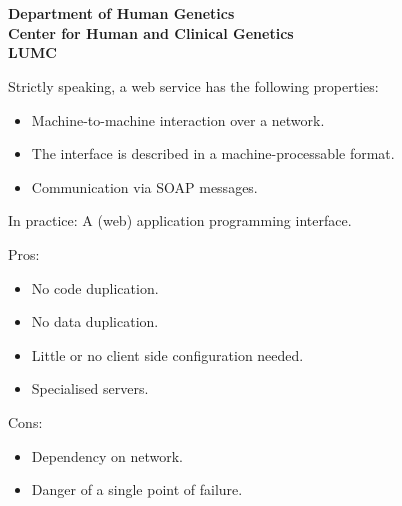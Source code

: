 \documentclass[a4, portrait]{seminar}
\begin{document}
\addtoslidelength{\slidewidth}{6cm}


\begin{slide}
\vspace*{1.5cm}
\begin{center}
{\bf\Large{\myTitle}}\\
\vfill
{\bf
  \small{\me}\\
  \small{Department of Human Genetics}\\
  \small{Center for Human and Clinical Genetics}\\
  \small{LUMC}
}
\vspace{1.1cm}
\end{center}
\end{slide}


\begin{slide}
Strictly speaking, a web service has the following properties:

\vspace*{1cm}
\begin{itemize}
\item Machine-to-machine interaction over a network.
\item The interface is described in a machine-processable format.
\item Communication via SOAP messages.
\end{itemize}

\vspace*{1cm}
In practice: A (web) application programming interface.
\vfill
\end{slide}

\begin{slide}
Pros:
\begin{itemize}
\item No code duplication.
\item No data duplication.
\item Little or no client side configuration needed.
\item Specialised servers.
\end{itemize}

\vspace*{1cm}
Cons:
\begin{itemize}
\item Dependency on network.
\item Danger of a single point of failure.
\end{itemize}
\vfill
\end{slide}
\end{document}
